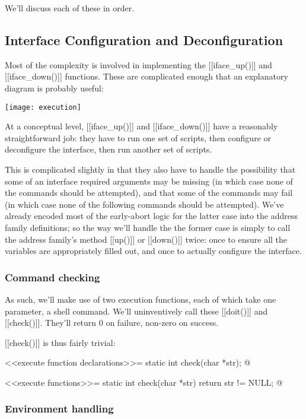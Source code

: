 \documentclass{article}
\begin{document}
We'll discuss each of these in order.

\subsection{Interface Configuration and Deconfiguration}

Most of the complexity is involved in implementing the [[iface_up()]] and
[[iface_down()]] functions. These are complicated enough that an explanatory
diagram is probably useful:

\begin{center}
\texttt{[image: execution]}
\end{center}

At a conceptual level, [[iface_up()]] and [[iface_down()]] have a
reasonably straightforward job: they have to run one set of scripts,
then configure or deconfigure the interface, then run another set of
scripts.

This is complicated slightly in that they also have to handle the
possibility that some of an interface required arguments may be missing
(in which case none of the commands should be attempted), and that some
of the commands may fail (in which case none of the following commands
should be attempted). We've already encoded most of the early-abort
logic for the latter case into the address family definitions; so the way
we'll handle the the former case is simply to call the address family's
method [[up()]] or [[down()]] twice: once to ensure all the variables are
appropriately filled out, and once to actually configure the interface.

\subsubsection{Command checking}

As such, we'll make use of two execution functions, each of which take
one parameter, a shell command. We'll uninventively call these [[doit()]]
and [[check()]]. They'll return 0 on failure, non-zero on success.

[[check()]] is thus fairly trivial:

<<execute function declarations>>=
static int check(char *str);
@

<<execute functions>>=
static int check(char *str) {
	return str != NULL;
}
@ 

\subsubsection{Environment handling}
\end{document}
